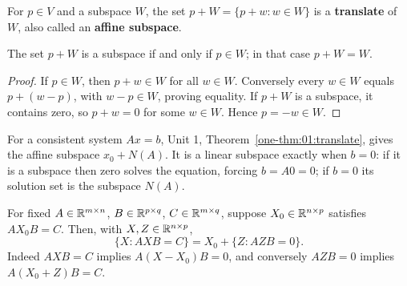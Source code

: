 For \(p\in V\) and a subspace \(W\), the set
\(p+W=\{p+w:w\in W\}\) is a \textbf{translate} of \(W\), also called
an \textbf{affine subspace}.

\begin{proposition}\label{prop:02:translate}
The set \(p+W\) is a subspace if and only if \(p\in W\); in that case
\(p+W=W\).
\end{proposition}
\begin{proof}
If \(p\in W\), then \(p+w\in W\) for all \(w\in W\). Conversely every
\(w\in W\) equals \(p+(w-p)\), with \(w-p\in W\), proving equality.
If \(p+W\) is a subspace, it contains zero, so \(p+w=0\) for some
\(w\in W\). Hence \(p=-w\in W\).
\end{proof}
For a consistent system \(Ax=b\), Unit 1,
Theorem~\ref{one-thm:01:translate}, gives the affine subspace
\(x_0+N(A)\). It is a linear subspace exactly when \(b=0\): if it is a
subspace then zero solves the equation, forcing \(b=A0=0\); if \(b=0\)
its solution set is the subspace \(N(A)\).

For fixed \(A\in\mathbb R^{m\times n}\), \(B\in\mathbb R^{p\times q}\),
\(C\in\mathbb R^{m\times q}\), suppose \(X_0\in\mathbb R^{n\times p}\) satisfies
\(AX_0B=C\). Then, with \(X,Z\in\mathbb R^{n\times p}\),
\[
\{X:AXB=C\}=X_0+\{Z:AZB=0\}.
\]
Indeed \(AXB=C\) implies \(A(X-X_0)B=0\), and conversely
\(AZB=0\) implies \(A(X_0+Z)B=C\).

